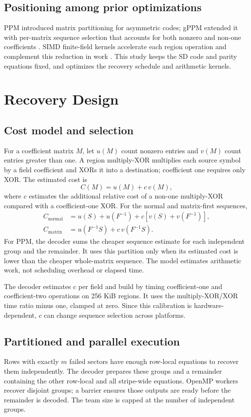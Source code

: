 \documentclass[conference]{IEEEtran}
\begin{document}
\subsection{Positioning among prior optimizations}
PPM introduced matrix partitioning for asymmetric codes; gPPM extended it with per-matrix sequence selection that accounts for both nonzero and non-one coefficients \cite{li2015ppm,li2023gppm}. SIMD finite-field kernels accelerate each region operation and complement this reduction in work \cite{plank2013simd}. This study keeps the SD code and parity equations fixed, and optimizes the recovery schedule and arithmetic kernels.

\section{Recovery Design}
\subsection{Cost model and selection}
For a coefficient matrix $M$, let $u(M)$ count nonzero entries and $v(M)$ count entries greater than one. A region multiply-XOR multiplies each source symbol by a field coefficient and XORs it into a destination; coefficient one requires only XOR. The estimated cost is
\begin{equation}
  C(M)=u(M)+c\,v(M),
\label{eq:cost}
\end{equation}
where $c$ estimates the additional relative cost of a non-one multiply-XOR compared with a coefficient-one XOR. For the normal and matrix-first sequences,
\begin{align}
 C_{\mathrm{normal}} &= u(S)+u(F^{-1})+c[v(S)+v(F^{-1})],\\
 C_{\mathrm{matrix}} &= u(F^{-1}S)+c\,v(F^{-1}S).
\end{align}
For PPM, the decoder sums the cheaper sequence estimate for each independent group and the remainder. It uses this partition only when its estimated cost is lower than the cheaper whole-matrix sequence. The model estimates arithmetic work, not scheduling overhead or elapsed time.

The decoder estimates $c$ per field and build by timing coefficient-one and coefficient-two operations on 256 KiB regions. It uses the multiply-XOR/XOR time ratio minus one, clamped at zero. Since this calibration is hardware-dependent, $c$ can change sequence selection across platforms.

\subsection{Partitioned and parallel execution}
Rows with exactly $m$ failed sectors have enough row-local equations to recover them independently. The decoder prepares these groups and a remainder containing the other row-local and all stripe-wide equations. OpenMP workers recover disjoint groups; a barrier ensures those outputs are ready before the remainder is decoded. The team size is capped at the number of independent groups.
\end{document}
